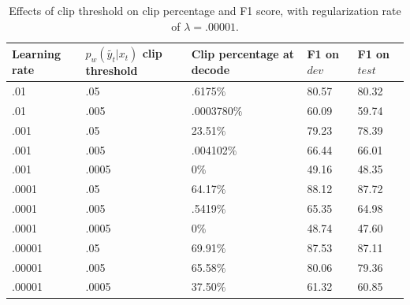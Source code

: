 \documentclass{article}
\begin{document}
\begin{table}[h]
\centering
\begin{tabular}{l|l|l|l|l}
Learning rate & $p_{w}(\tilde{y_{t}}|x_{t})$ clip threshold& Clip percentage at decode & F1 on $dev$ & F1 on $test$\\
\hline
.01 & .05 & .6175$\%$ & 80.57 & 80.32 \\
\hline
.01 & .005 & .0003780$\%$ & 60.09 & 59.74 \\
\hline
.001 & .05 & 23.51$\%$ & 79.23 & 78.39 \\
\hline
.001 & .005 & .004102$\%$ & 66.44 & 66.01\\
\hline
.001 & .0005 & 0$\%$ & 49.16 & 48.35\\
\hline
.0001 & .05 & 64.17$\%$ & 88.12 & 87.72\\
\hline
.0001 & .005 & .5419$\%$ & 65.35 & 64.98\\
\hline
.0001 & .0005 & 0$\%$ & 48.74 & 47.60\\
\hline
.00001 & .05 & 69.91$\%$ & 87.53 & 87.11 \\
\hline
.00001 & .005 & 65.58$\%$ & 80.06 &79.36 \\
\hline
.00001 & .0005 & 37.50$\%$ & 61.32 & 60.85  \\
\end{tabular}
\caption{Effects of clip threshold on clip percentage and F1 score, with regularization rate of $\lambda=.00001$.}
\end{table}
\end{document}

